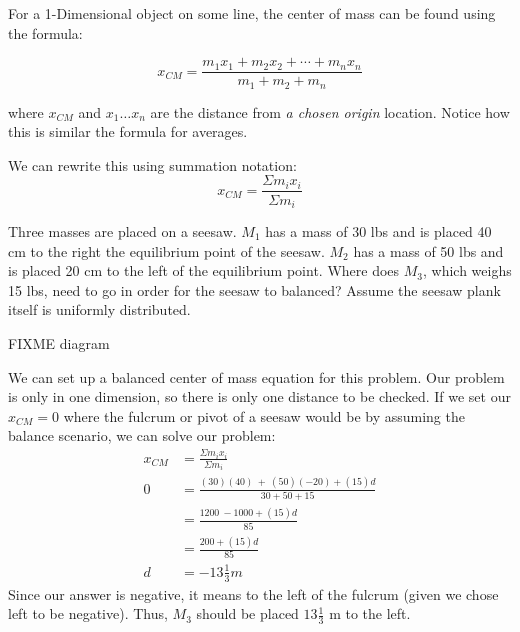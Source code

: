 For a 1-Dimensional object on some line, the center of mass can be found using the formula:

\begin{mdframed}[style=important, frametitle={1-Dimensional Center of Mass}]
$$x_{CM} = \frac{m_1x_1 + m_2x_2 + \cdots + m_nx_n}{m_1 + m_2 + m_n}$$

where $x_{CM}$ and $x_1 \dots x_n$ are the distance from \emph{a chosen origin} location. Notice how this is similar the formula for averages.

We can rewrite this using summation notation:
$$x_{CM} = \frac{\Sigma m_i x_i}{\Sigma m_i}$$
\end{mdframed}

\begin{Exercise}[title=Balancing a seesaw, label=center_of_mass1]
Three masses are placed on a seesaw. $M_1$ has a mass of 30 lbs and is placed 40 cm to the right the equilibrium point of the seesaw. $M_2$ has a mass of 50 lbs and is placed 20 cm to the left of the equilibrium point. Where does $M_3$, which weighs 15 lbs, need to go in order for the seesaw to balanced? Assume the seesaw plank itself is uniformly distributed.

FIXME diagram
\end{Exercise}
\begin{Answer}[ref=center_of_mass1]
We can set up a balanced center of mass equation for this problem. Our problem is only in one dimension, so there is only one distance to be checked. If we set our $x_{CM} = 0$ where the fulcrum or pivot of a seesaw would be by assuming the balance scenario, we can solve our problem:
\begin{align*}
x_{CM} &= \frac{\Sigma m_i x_i}{\Sigma m_i} \\ 
0 &= \frac{\left(30\right)\left(40\right)\ +\ \left(50\right)\left(-20\right)+\left(15\right)d}{30+50+15} \\
 &= \frac{1200\ -1000 +\left(15\right)d}{85} \\
 &= \frac{200 +\left(15\right)d}{85} \\
d &= -13\tfrac{1}{3} m
\end{align*}
Since our answer is negative, it means to the left of the fulcrum (given we chose left to be negative). Thus, $M_3$ should be placed $13\tfrac{1}{3}$ m to the left.
\end{Answer}

